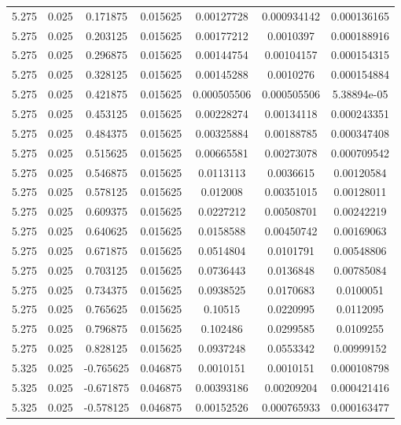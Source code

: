 \begin{table}[bh]
\begin{center}
{\begin{tabular}{ccccccc}
5.275	 & 0.025 & 	0.171875	 & 0.015625	 & 0.00127728	 & 0.000934142	 & 0.000136165 \\ 
5.275	 & 0.025 & 	0.203125	 & 0.015625	 & 0.00177212	 & 0.0010397	 & 0.000188916 \\ 
5.275	 & 0.025 & 	0.296875	 & 0.015625	 & 0.00144754	 & 0.00104157	 & 0.000154315 \\ 
5.275	 & 0.025 & 	0.328125	 & 0.015625	 & 0.00145288	 & 0.0010276	 & 0.000154884 \\ 
5.275	 & 0.025 & 	0.421875	 & 0.015625	 & 0.000505506	 & 0.000505506	 & 5.38894e-05 \\ 
5.275	 & 0.025 & 	0.453125	 & 0.015625	 & 0.00228274	 & 0.00134118	 & 0.000243351 \\ 
5.275	 & 0.025 & 	0.484375	 & 0.015625	 & 0.00325884	 & 0.00188785	 & 0.000347408 \\ 
5.275	 & 0.025 & 	0.515625	 & 0.015625	 & 0.00665581	 & 0.00273078	 & 0.000709542 \\ 
5.275	 & 0.025 & 	0.546875	 & 0.015625	 & 0.0113113	 & 0.0036615	 & 0.00120584 \\ 
5.275	 & 0.025 & 	0.578125	 & 0.015625	 & 0.012008	 & 0.00351015	 & 0.00128011 \\ 
5.275	 & 0.025 & 	0.609375	 & 0.015625	 & 0.0227212	 & 0.00508701	 & 0.00242219 \\ 
5.275	 & 0.025 & 	0.640625	 & 0.015625	 & 0.0158588	 & 0.00450742	 & 0.00169063 \\ 
5.275	 & 0.025 & 	0.671875	 & 0.015625	 & 0.0514804	 & 0.0101791	 & 0.00548806 \\ 
5.275	 & 0.025 & 	0.703125	 & 0.015625	 & 0.0736443	 & 0.0136848	 & 0.00785084 \\ 
5.275	 & 0.025 & 	0.734375	 & 0.015625	 & 0.0938525	 & 0.0170683	 & 0.0100051 \\ 
5.275	 & 0.025 & 	0.765625	 & 0.015625	 & 0.10515	 & 0.0220995	 & 0.0112095 \\ 
5.275	 & 0.025 & 	0.796875	 & 0.015625	 & 0.102486	 & 0.0299585	 & 0.0109255 \\ 
5.275	 & 0.025 & 	0.828125	 & 0.015625	 & 0.0937248	 & 0.0553342	 & 0.00999152 \\ 
5.325	 & 0.025 & 	-0.765625	 & 0.046875	 & 0.0010151	 & 0.0010151	 & 0.000108798 \\ 
5.325	 & 0.025 & 	-0.671875	 & 0.046875	 & 0.00393186	 & 0.00209204	 & 0.000421416 \\ 
5.325	 & 0.025 & 	-0.578125	 & 0.046875	 & 0.00152526	 & 0.000765933	 & 0.000163477 \\ 

\end{tabular}}
\end{center}
\end{table}
